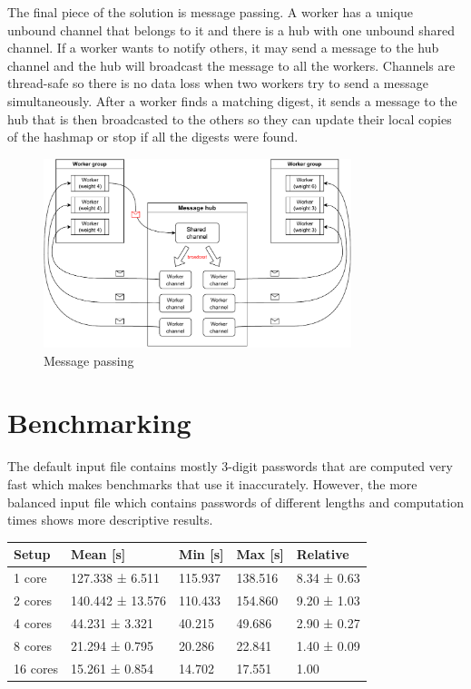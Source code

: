 \documentclass{article}
\begin{document}
The final piece of the solution is message passing. A worker has a unique unbound channel that belongs to it and there is a hub with one unbound shared channel. If a worker wants to notify others, it may send a message to the hub channel and the hub will broadcast the message to all the workers. Channels are thread-safe so there is no data loss when two workers try to send a message simultaneously. After a worker finds a matching digest, it sends a message to the hub that is then broadcasted to the others so they can update their local copies of the hashmap or stop if all the digests were found.

\begin{figure}[h]
  \caption{Message passing}
  \vspace{0.2in}
  \centering
  \includegraphics[width=0.8\textwidth]{resources/message_passing.pdf}
\end{figure}

\section{Benchmarking}

The default input file contains mostly 3-digit passwords that are computed very fast which makes benchmarks that use it inaccurately. However, the more balanced input file which contains passwords of different lengths and computation times shows more descriptive results.

\begin{table}[!ht]
    \centering
    \begin{tabular}{|l|l|l|l|l|}
    \hline
        Setup & Mean [s] & Min [s] & Max [s] & Relative \\ \hline
        1 core & 127.338 ± 6.511 & 115.937 & 138.516 & 8.34 ± 0.63 \\ \hline
        2 cores & 140.442 ± 13.576 & 110.433 & 154.860 & 9.20 ± 1.03 \\ \hline
        4 cores & 44.231 ± 3.321 & 40.215 & 49.686 & 2.90 ± 0.27 \\ \hline
        8 cores & 21.294 ± 0.795 & 20.286 & 22.841 & 1.40 ± 0.09 \\ \hline
        16 cores & 15.261 ± 0.854 & 14.702 & 17.551 & 1.00 \\ \hline
    \end{tabular}
\end{table}
\end{document}
